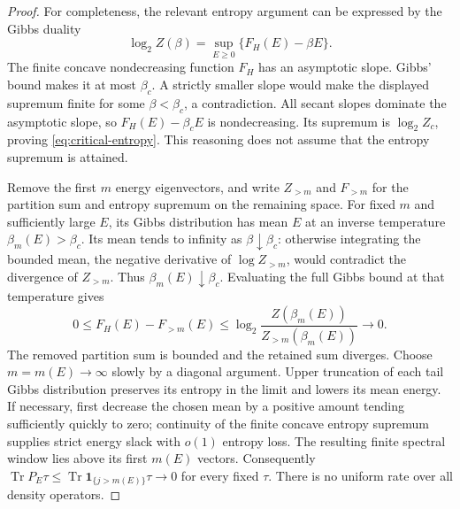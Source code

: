 \documentclass[11pt]{article}
\newcommand{\Tr}{\operatorname{Tr}}
\begin{document}
\begin{proof}
For completeness, the relevant entropy argument can be expressed by
the Gibbs duality
\[
 \log_2 Z(\beta)=\sup_{E\ge0}\{F_H(E)-\beta E\}.
\]
The finite concave nondecreasing function $F_H$ has an asymptotic
slope. Gibbs' bound makes it at most $\beta_c$. A strictly smaller
slope would make the displayed supremum finite for some
$\beta<\beta_c$, a contradiction. All secant slopes dominate the
asymptotic slope, so $F_H(E)-\beta_cE$ is nondecreasing. Its
supremum is $\log_2 Z_c$, proving \eqref{eq:critical-entropy}.
This reasoning does not assume that the entropy supremum is attained.

Remove the first $m$ energy eigenvectors, and write $Z_{>m}$ and
$F_{>m}$ for the partition sum and entropy supremum on the remaining
space. For fixed $m$ and sufficiently large $E$, its Gibbs distribution
has mean $E$ at an inverse temperature $\beta_m(E)>\beta_c$.
Its mean tends to infinity as $\beta\downarrow\beta_c$: otherwise
integrating the bounded mean, the negative derivative of
$\log Z_{>m}$, would contradict the divergence of $Z_{>m}$.
Thus $\beta_m(E)\downarrow\beta_c$. Evaluating the full Gibbs bound
at that temperature gives
\[
 0\le F_H(E)-F_{>m}(E)
 \le\log_2\frac{Z(\beta_m(E))}{Z_{>m}(\beta_m(E))}
 \longrightarrow0.
\]
The removed partition sum is bounded and the retained sum diverges.
Choose $m=m(E)\to\infty$ slowly by a diagonal argument. Upper
truncation of each tail Gibbs distribution preserves its entropy in
the limit and lowers its mean energy. If necessary, first decrease
the chosen mean by a positive amount tending sufficiently quickly
to zero; continuity of the finite concave entropy supremum supplies
strict energy slack with $o(1)$ entropy loss. The resulting finite
spectral window lies above its first $m(E)$ vectors. Consequently
$\Tr P_E\tau\le\Tr\mathbf1_{\{j>m(E)\}}\tau\to0$ for every fixed
$\tau$. There is no uniform rate over all density operators.
\end{proof}
\end{document}
